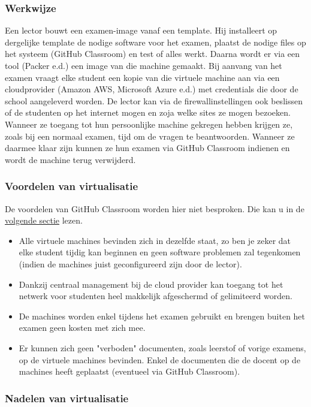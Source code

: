 \subsubsection{Werkwijze}
Een lector bouwt een examen-image vanaf een template. Hij installeert op dergelijke template de nodige software voor het examen, plaatst de nodige files op het systeem (GitHub Classroom) en test of alles werkt.  Daarna wordt er via een tool (Packer e.d.) een image van die machine gemaakt.  Bij aanvang van het examen vraagt elke student een kopie van die virtuele machine aan via een cloudprovider (Amazon AWS, Microsoft Azure e.d.) met credentials die door de school aangeleverd worden. De lector kan via de firewallinstellingen ook beslissen of de studenten op het internet mogen en zoja welke sites ze mogen bezoeken. Wanneer ze toegang tot hun persoonlijke machine gekregen hebben krijgen ze, zoals bij een normaal examen, tijd om de vragen te beantwoorden. Wanneer ze daarmee klaar zijn kunnen ze hun examen via GitHub Classroom indienen en wordt de machine terug verwijderd. 

\subsubsection{Voordelen van virtualisatie}

De voordelen van GitHub Classroom worden hier niet besproken. Die kan u in de \hyperref[sec:GHC]{volgende sectie} lezen.
\begin{itemize}
 \item Alle virtuele machines bevinden zich in dezelfde staat, zo ben je zeker dat elke student tijdig kan beginnen en geen software problemen zal tegenkomen (indien de machines juist geconfigureerd zijn door de lector). 
 \item Dankzij centraal management bij de cloud provider kan toegang tot het netwerk voor studenten heel makkelijk afgeschermd of gelimiteerd worden.
 \item  De machines worden enkel tijdens het examen gebruikt en brengen buiten het examen geen kosten met zich mee. 
 \item Er kunnen zich geen "verboden" documenten, zoals leerstof of vorige examens, op de virtuele machines bevinden. Enkel de documenten die de docent op de machines heeft geplaatst (eventueel via GitHub Classroom).
\end{itemize}

\subsubsection{Nadelen van virtualisatie}


